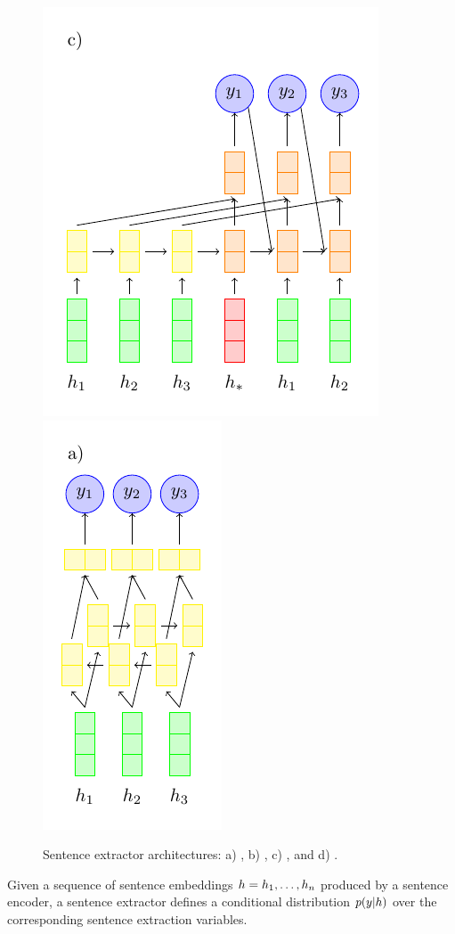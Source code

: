 \begin{figure}
  \includegraphics[scale=.7]{figures/clextractor.pdf}
  \includegraphics[scale=.7]{figures/rnnextractor.pdf}
  \caption{Sentence extractor architectures: a) \modelOneBF, b) \modelTwoBF,
            c) \baselineOneBF, and d) \baselineTwoBF. }
  \label{fig:extractors}
\end{figure}

Given a sequence of sentence embeddings $\sentEmb = \sentEmb[1], \ldots, \sentEmb[\docSize]$ produced by a sentence encoder, 
a sentence extractor defines a conditional distribution $p(\slabel|\sentEmb)$
over the corresponding sentence extraction variables.

